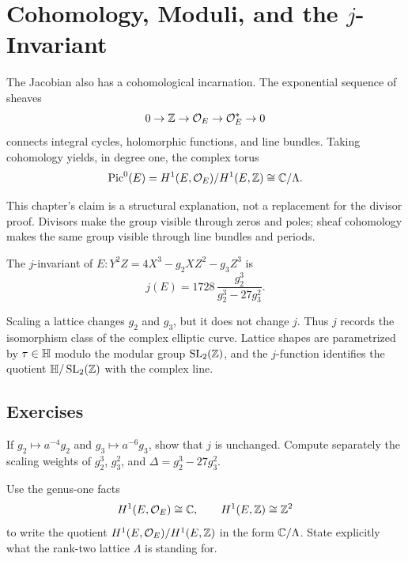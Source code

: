\chapter{Cohomology, Moduli, and the \texorpdfstring{\(j\)}{j}-Invariant}
\label{ch:cohomology-moduli}

The Jacobian also has a cohomological incarnation.  The exponential sequence of
sheaves
\[
  0\to\mathbb{Z}\to\mathcal{O}_E\to\mathcal{O}_E^*\to0
\]
connects integral cycles, holomorphic functions, and line bundles.  Taking
cohomology yields, in degree one, the complex torus
\[
  \operatorname{Pic}^0(E)=H^1(E,\mathcal{O}_E)/H^1(E,\mathbb{Z})\cong\mathbb{C}/\Lambda.
\]

\begin{center}
\resizebox{0.78\linewidth}{!}{\classicExpSequenceDiagram}
\end{center}

This chapter's claim is a structural explanation, not a replacement for the
divisor proof.  Divisors make the group visible through zeros and poles; sheaf
cohomology makes the same group visible through line bundles and periods.

\begin{definition}
The \(j\)-invariant of \(E:Y^2Z=4X^3-g_2XZ^2-g_3Z^3\) is
\[
  j(E)=1728\,\frac{g_2^3}{g_2^3-27g_3^2}.
\]
\end{definition}

Scaling a lattice changes \(g_2\) and \(g_3\), but it does not change \(j\).
Thus \(j\) records the isomorphism class of the complex elliptic curve.  Lattice
shapes are parametrized by \(\tau\in\mathbb{H}\) modulo the modular group
\(\operatorname{SL}_2(\mathbb{Z})\), and the \(j\)-function identifies the quotient
\(\mathbb{H}/\operatorname{SL}_2(\mathbb{Z})\) with the complex line.

\section*{Exercises}

\begin{exercise}
If \(g_2\mapsto a^{-4}g_2\) and \(g_3\mapsto a^{-6}g_3\), show that \(j\) is
unchanged.  Compute separately the scaling weights of \(g_2^3\), \(g_3^2\), and
\(\Delta=g_2^3-27g_3^2\).
\end{exercise}

\begin{exercise}
Use the genus-one facts
\[
  H^1(E,\mathcal{O}_E)\cong\mathbb{C},\qquad H^1(E,\mathbb{Z})\cong\mathbb{Z}^2
\]
to write the quotient \(H^1(E,\mathcal{O}_E)/H^1(E,\mathbb{Z})\) in the form
\(\mathbb{C}/\Lambda\).  State explicitly what the rank-two lattice \(\Lambda\) is
standing for.
\end{exercise}


